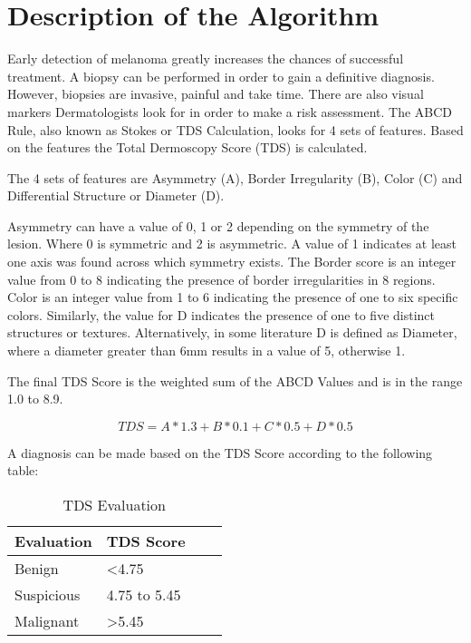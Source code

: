 \section{Description of the Algorithm}

Early detection of melanoma greatly increases the chances of successful treatment. A biopsy can be performed in order to gain a definitive diagnosis. However, biopsies are invasive, painful and take time. There are also visual markers Dermatologists look for in order to make a risk assessment. The ABCD Rule, also known as Stokes or TDS Calculation, looks for 4 sets of features. Based on the features the Total Dermoscopy Score (TDS) is calculated.

The 4 sets of features are Asymmetry (A), Border Irregularity (B), Color (C) and Differential Structure or Diameter (D).

Asymmetry can have a value of 0, 1 or 2 depending on the symmetry of the lesion. Where 0 is symmetric and 2 is asymmetric. A value of 1 indicates at least one axis was found across which symmetry exists. The Border score is an integer value from 0 to 8 indicating the presence of border irregularities in 8 regions. Color is an integer value from 1 to 6 indicating the presence of one to six specific colors. Similarly, the value for D indicates the presence of one to five distinct structures or textures. Alternatively, in some literature\cite{Siddiq_2015} D is defined as Diameter, where a diameter greater than 6mm results in a value of 5, otherwise 1.

The final TDS Score is the weighted sum of the ABCD Values and is in the range 1.0 to 8.9.

\begin{equation}
\label{eq:tds_formula}
TDS = A * 1.3 + B * 0.1 + C * 0.5 + D * 0.5
\end{equation}

A diagnosis can be made based on the TDS Score according to the following table:

\begin{table}[H]
\centering
\small
    \begin{tabular}{ | l | p{3.5cm} | l | p{3.5cm} |}
    \hline
    Evaluation & TDS Score \\ \hline
    Benign & \textless  4.75  \\ \hline
    Suspicious & 4.75 to 5.45  \\ \hline
    Malignant & \textgreater  5.45  \\ \hline

    \end{tabular}

    \caption{TDS Evaluation\cite{Weigert_2012}}
    \label{fig:tds_eval}

\end{table}

